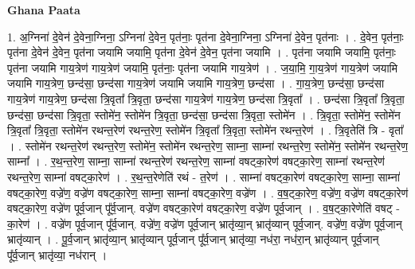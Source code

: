 \documentclass[17pt]{extarticle}
\begin{document}
\textbf{Ghana Paata } \newline

1. अ॒ग्निना॑ दे॒वेन॑ दे॒वेना॒ग्निना॒ ऽग्निना॑ दे॒वेन॒ पृत॑नाः॒ पृत॑ना दे॒वेना॒ग्निना॒ ऽग्निना॑ दे॒वेन॒ पृत॑नाः । . दे॒वेन॒ पृत॑नाः॒ पृत॑ना दे॒वेन॑ दे॒वेन॒ पृत॑ना जयामि जयामि॒ पृत॑ना दे॒वेन॑ दे॒वेन॒ पृत॑ना जयामि । . पृत॑ना जयामि जयामि॒ पृत॑नाः॒ पृत॑ना जयामि गाय॒त्रेण॑ गाय॒त्रेण॑ जयामि॒ पृत॑नाः॒ पृत॑ना जयामि गाय॒त्रेण॑ । . ज॒या॒मि॒ गा॒य॒त्रेण॑ गाय॒त्रेण॑ जयामि जयामि गाय॒त्रेण॒ छन्द॑सा॒ छन्द॑सा गाय॒त्रेण॑ जयामि जयामि गाय॒त्रेण॒ छन्द॑सा । . गा॒य॒त्रेण॒ छन्द॑सा॒ छन्द॑सा गाय॒त्रेण॑ गाय॒त्रेण॒ छन्द॑सा त्रि॒वृता᳚ त्रि॒वृता॒ छन्द॑सा गाय॒त्रेण॑ गाय॒त्रेण॒ छन्द॑सा त्रि॒वृता᳚ । . छन्द॑सा त्रि॒वृता᳚ त्रि॒वृता॒ छन्द॑सा॒ छन्द॑सा त्रि॒वृता॒ स्तोमे॑न॒ स्तोमे॑न त्रि॒वृता॒ छन्द॑सा॒ छन्द॑सा त्रि॒वृता॒ स्तोमे॑न । . त्रि॒वृता॒ स्तोमे॑न॒ स्तोमे॑न त्रि॒वृता᳚ त्रि॒वृता॒ स्तोमे॑न रथन्त॒रेण॑ रथन्त॒रेण॒ स्तोमे॑न त्रि॒वृता᳚ त्रि॒वृता॒ स्तोमे॑न रथन्त॒रेण॑ । . त्रि॒वृतेति॑ त्रि - वृता᳚ । . स्तोमे॑न रथन्त॒रेण॑ रथन्त॒रेण॒ स्तोमे॑न॒ स्तोमे॑न रथन्त॒रेण॒ साम्ना॒ साम्ना॑ रथन्त॒रेण॒ स्तोमे॑न॒ स्तोमे॑न रथन्त॒रेण॒ साम्ना᳚ । . र॒थ॒न्त॒रेण॒ साम्ना॒ साम्ना॑ रथन्त॒रेण॑ रथन्त॒रेण॒ साम्ना॑ वषट्का॒रेण॑ वषट्का॒रेण॒ साम्ना॑ रथन्त॒रेण॑ रथन्त॒रेण॒ साम्ना॑ वषट्का॒रेण॑ । . र॒थ॒न्त॒रेणेति॑ रथं - त॒रेण॑ । . साम्ना॑ वषट्का॒रेण॑ वषट्का॒रेण॒ साम्ना॒ साम्ना॑ वषट्का॒रेण॒ वज्रे॑ण॒ वज्रे॑ण वषट्का॒रेण॒ साम्ना॒ साम्ना॑ वषट्का॒रेण॒ वज्रे॑ण । . व॒ष॒ट्का॒रेण॒ वज्रे॑ण॒ वज्रे॑ण वषट्का॒रेण॑ वषट्का॒रेण॒ वज्रे॑ण पूर्व॒जान् पू᳚र्व॒जान्. वज्रे॑ण वषट्का॒रेण॑ वषट्का॒रेण॒ वज्रे॑ण पूर्व॒जान् । . व॒ष॒ट्का॒रेणेति॑ वषट् - का॒रेण॑ । . वज्रे॑ण पूर्व॒जान् पू᳚र्व॒जान्. वज्रे॑ण॒ वज्रे॑ण पूर्व॒जान् भ्रातृ॑व्या॒न् भ्रातृ॑व्यान् पूर्व॒जान्. वज्रे॑ण॒ वज्रे॑ण पूर्व॒जान् भ्रातृ॑व्यान् । . पू॒र्व॒जान् भ्रातृ॑व्या॒न् भ्रातृ॑व्यान् पूर्व॒जान् पू᳚र्व॒जान् भ्रातृ॑व्या॒ नध॑रा॒ नध॑रा॒न् भ्रातृ॑व्यान् पूर्व॒जान् पू᳚र्व॒जान् भ्रातृ॑व्या॒ नध॑रान् । \newline
\end{document}
